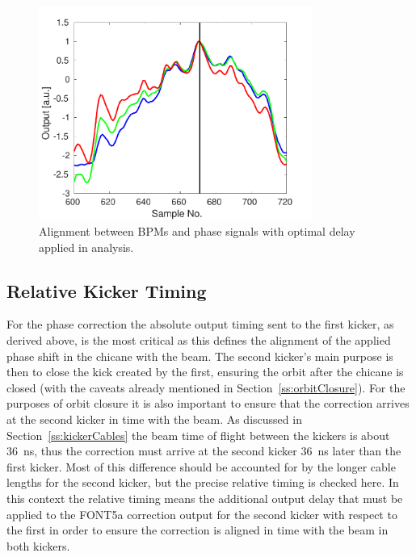 \begin{figure}
  \centering
  \includegraphics[width=0.8\textwidth]{Figures/commissioning/absTimBeam_opt}
  \caption{Alignment between BPMs and phase signals with optimal delay applied in analysis.}
  \label{f:absTimBeam_opt}
\end{figure}


\subsection{Relative Kicker Timing}
\label{ss:relativeTiming}

For the phase correction the absolute output timing sent to the first kicker, as derived above, is the most critical as this defines the alignment of the applied phase shift in the chicane with the beam. The second kicker's main purpose is then to close the kick created by the first, ensuring the orbit after the chicane is closed (with the caveats already mentioned in Section~\ref{ss:orbitClosure}). For the purposes of orbit closure it is also important to ensure that the correction arrives at the second kicker in time with the beam. As discussed in Section~\ref{ss:kickerCables} the beam time of flight between the kickers is about 36~ns, thus the correction must arrive at the second kicker 36~ns later than the first kicker. Most of this difference should be accounted for by the longer cable lengths for the second kicker, but the precise relative timing is checked here. In this context the relative timing means the additional output delay that must be applied to the FONT5a correction output for the second kicker with respect to the first in order to ensure the correction is aligned in time with the beam in both kickers.

